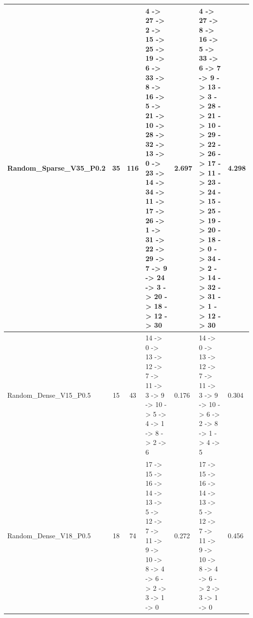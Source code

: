 \documentclass[8pt]{article}
\begin{document}
\begin{longtable}{@{}L{3.2cm} c c L{4cm} L{1.2cm} L{4cm} L{1.2cm}@{}}
Random\_Sparse\_V35\_P0.2 & 35 & 116 & 4 -\textgreater{} 27 -\textgreater{} 2 -\textgreater{} 15 -\textgreater{} 25 -\textgreater{} 19 -\textgreater{} 6 -\textgreater{} 33 -\textgreater{} 8 -\textgreater{} 16 -\textgreater{} 5 -\textgreater{} 21 -\textgreater{} 10 -\textgreater{} 28 -\textgreater{} 32 -\textgreater{} 13 -\textgreater{} 0 -\textgreater{} 23 -\textgreater{} 14 -\textgreater{} 34 -\textgreater{} 11 -\textgreater{} 17 -\textgreater{} 26 -\textgreater{} 1 -\textgreater{} 31 -\textgreater{} 22 -\textgreater{} 29 -\textgreater{} 7 -\textgreater{} 9 -\textgreater{} 24 -\textgreater{} 3 -\textgreater{} 20 -\textgreater{} 18 -\textgreater{} 12 -\textgreater{} 30 & 2.697 & 4 -\textgreater{} 27 -\textgreater{} 8 -\textgreater{} 16 -\textgreater{} 5 -\textgreater{} 33 -\textgreater{} 6 -\textgreater{} 7 -\textgreater{} 9 -\textgreater{} 13 -\textgreater{} 3 -\textgreater{} 28 -\textgreater{} 21 -\textgreater{} 10 -\textgreater{} 29 -\textgreater{} 22 -\textgreater{} 26 -\textgreater{} 17 -\textgreater{} 11 -\textgreater{} 23 -\textgreater{} 24 -\textgreater{} 15 -\textgreater{} 25 -\textgreater{} 19 -\textgreater{} 20 -\textgreater{} 18 -\textgreater{} 0 -\textgreater{} 34 -\textgreater{} 2 -\textgreater{} 14 -\textgreater{} 32 -\textgreater{} 31 -\textgreater{} 1 -\textgreater{} 12 -\textgreater{} 30 & 4.298 \\
\midrule
Random\_Dense\_V15\_P0.5 & 15 & 43 & 14 -\textgreater{} 0 -\textgreater{} 13 -\textgreater{} 12 -\textgreater{} 7 -\textgreater{} 11 -\textgreater{} 3 -\textgreater{} 9 -\textgreater{} 10 -\textgreater{} 5 -\textgreater{} 4 -\textgreater{} 1 -\textgreater{} 8 -\textgreater{} 2 -\textgreater{} 6 & 0.176 & 14 -\textgreater{} 0 -\textgreater{} 13 -\textgreater{} 12 -\textgreater{} 7 -\textgreater{} 11 -\textgreater{} 3 -\textgreater{} 9 -\textgreater{} 10 -\textgreater{} 6 -\textgreater{} 2 -\textgreater{} 8 -\textgreater{} 1 -\textgreater{} 4 -\textgreater{} 5 & 0.304 \\
\midrule
Random\_Dense\_V18\_P0.5 & 18 & 74 & 17 -\textgreater{} 15 -\textgreater{} 16 -\textgreater{} 14 -\textgreater{} 13 -\textgreater{} 5 -\textgreater{} 12 -\textgreater{} 7 -\textgreater{} 11 -\textgreater{} 9 -\textgreater{} 10 -\textgreater{} 8 -\textgreater{} 4 -\textgreater{} 6 -\textgreater{} 2 -\textgreater{} 3 -\textgreater{} 1 -\textgreater{} 0 & 0.272 & 17 -\textgreater{} 15 -\textgreater{} 16 -\textgreater{} 14 -\textgreater{} 13 -\textgreater{} 5 -\textgreater{} 12 -\textgreater{} 7 -\textgreater{} 11 -\textgreater{} 9 -\textgreater{} 10 -\textgreater{} 8 -\textgreater{} 4 -\textgreater{} 6 -\textgreater{} 2 -\textgreater{} 3 -\textgreater{} 1 -\textgreater{} 0 & 0.456 \\

\end{longtable}
\end{document}
